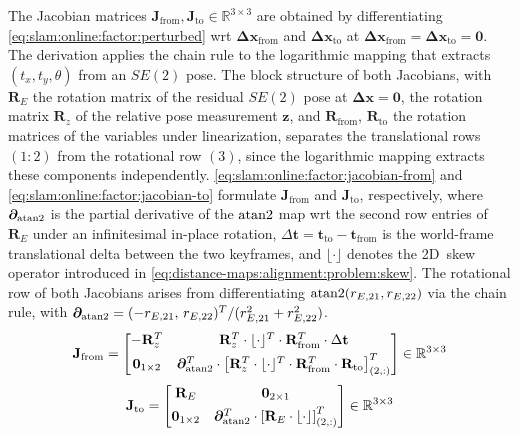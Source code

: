 The Jacobian matrices
$\mathbf{J}_{\mathrm{from}},\mathbf{J}_{\mathrm{to}}\in\mathbb{R}^{3\times3}$
are obtained by differentiating
\eqref{eq:slam:online:factor:perturbed} \gls{wrt}
$\mathbf{\Delta x}_{\mathrm{from}}$ and
$\mathbf{\Delta x}_{\mathrm{to}}$ at
$\mathbf{\Delta x}_{\mathrm{from}}=\mathbf{\Delta x}_{\mathrm{to}}=\mathbf{0}$.
The derivation applies the chain rule to the logarithmic mapping that
extracts $(t_x, t_y, \theta)$ from an $SE(2)$ pose.
The block structure of both Jacobians, with $\mathbf{R}_E$ the rotation
matrix of the residual $SE(2)$ pose at $\mathbf{\Delta x}=\mathbf{0}$,
the rotation matrix $\mathbf{R}_z$ of the relative pose measurement
$\mathbf{z}$, and $\mathbf{R}_{\mathrm{from}}$, $\mathbf{R}_{\mathrm{to}}$
the rotation matrices of the variables under linearization, separates
the translational rows $(1{:}2)$ from the rotational row $(3)$,
since the logarithmic mapping extracts these components independently.
\eqref{eq:slam:online:factor:jacobian-from} and
\eqref{eq:slam:online:factor:jacobian-to} formulate
$\mathbf{J}_{\mathrm{from}}$ and $\mathbf{J}_{\mathrm{to}}$,
respectively, where $\boldsymbol{\partial}_{\atan2}$ is the partial derivative
of the $\atan2$ map \gls{wrt} the second row entries of $\mathbf{R}_E$
under an infinitesimal in-place rotation, $\Delta\mathbf{t} =
\mathbf{t}_{\mathrm{to}}-\mathbf{t}_{\mathrm{from}}$ is the world-frame
translational delta between the two keyframes, and
$\lfloor\cdot\rfloor$ denotes the 2D~skew operator introduced in
\eqref{eq:distance-maps:alignment:problem:skew}.
The rotational row of both Jacobians arises from differentiating
$\atan2(r_{E,21}, r_{E,22})$ via the chain rule, with
$\boldsymbol{\partial}_{\atan2} = (-r_{E,21},\,r_{E,22})^T /
(r_{E,21}^2 + r_{E,22}^2)$.
\begin{equation}
\label{eq:slam:online:factor:jacobian-from}
\mathbf{J}_{\mathrm{from}} =
\begin{bmatrix}
-\mathbf{R}_z^T &
\mathbf{R}_z^T\cdot\lfloor\cdot\rfloor^T\cdot \mathbf{R}_{\mathrm{from}}^T\cdot\Delta\mathbf{t} \\[3pt]
\mathbf{0}_{1\times2} &
\boldsymbol{\partial}_{\atan2}^T \cdot
\left[\mathbf{R}_z^T\cdot\lfloor\cdot\rfloor^T\cdot
      \mathbf{R}_{\mathrm{from}}^T\cdot\mathbf{R}_{\mathrm{to}}\right]_{(2,:)}^T
\end{bmatrix}
\in\mathbb{R}^{3\times3}
\end{equation}
\begin{equation}
\label{eq:slam:online:factor:jacobian-to}
\mathbf{J}_{\mathrm{to}} =
\begin{bmatrix}
\mathbf{R}_E &
\mathbf{0}_{2\times1} \\[3pt]
\mathbf{0}_{1\times2} &
\boldsymbol{\partial}_{\atan2}^T \cdot
\left[\mathbf{R}_E\cdot\lfloor\cdot\rfloor\right]_{(2,:)}^T
\end{bmatrix}
\in\mathbb{R}^{3\times3}
\end{equation}

